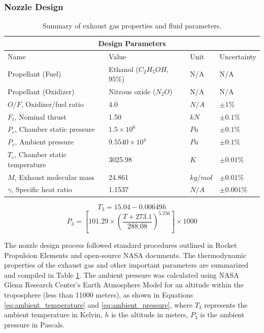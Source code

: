 \documentclass[9pt]{article} %
\numberwithin{equation}{section} %
\begin{document}
\subsubsection{Nozzle Design}

\begin{table}[!htb]
\centering
\begin{tabular}{ |p{5cm}||p{4cm}|p{1cm}|p{2cm}|  }
\hline
\multicolumn{4}{|c|}{Design Parameters} \\
\hline
Name & Value & Unit & Uncertainty \\
\hline
Propellant (Fuel)  &  Ethanol ($C_{2}H_{5}OH$, $95\%$)   &  N/A  &  N/A \\
Propellant (Oxidizer)  &  Nitrous oxide ($N_{2}O$) & N/A  &  N/A \\
$O/F$, Oxidizer/fuel ratio &  4.0  &  $N/A$  &   $\pm 1 \%$ \\
$F_{t}$, Nominal thrust &  1.50 &  $kN$  &  $\pm 0.1 \%$ \\
$P_{c}$, Chamber static pressure &  $1.5 \times 10^{6}$  &  $Pa$  &  $\pm 0.1 \%$ \\
$P_{e}$, Ambient pressure &  $9.5540 \times 10^{4}$  &  $Pa$  &  $\pm 0.1 \%$ \\
$T_{c}$, Chamber static temperature &  3025.98  &  $K$  &  $\pm 0.01 \%$  \\
$M$, Exhaust molecular mass &  24.861  &  $kg/mol$  &   $\pm 0.01 \%$ \\
$\gamma$, Specific heat ratio  &  1.1537  &  $N/A$  &   $\pm 0.001 \%$ \\
\hline
\end{tabular}
\caption{Summary of exhaust gas properties and fluid parameters.}
\label{table:gas_parameters}
\end{table}

\begin{equation} \label{eq:ambient_temperature}
T_{3} = 15.04 - 0.00649 h 
\end{equation}
\begin{equation} \label{eq:ambient_pressure}
P_{3} = \left[101.29 \times \left( \frac{T + 273.1}{288.08} \right) ^ {5.256} \right] \times 1000
\end{equation}

The nozzle design process followed standard procedures outlined in Rocket Propulsion Elements \cite{rpe} and open-source NASA documents. The thermodynamic properties of the exhaust gas and other important parameters are summarized and compiled in Table \ref{table:gas_parameters}. The ambient pressure was calculated using NASA Glenn Research Center's Earth Atmosphere Model for an altitude within the troposphere (less than 11000 meters), as shown in Equations \ref{eq:ambient_temperature} and \ref{eq:ambient_pressure}, where $T_{3}$ represents the ambient temperature in Kelvin, $h$ is the altitude in meters, $P_{3}$ is the ambient pressure in Pascals.
\end{document}
